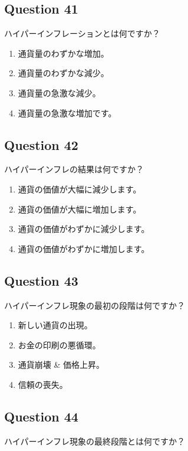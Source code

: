 \documentclass[12pt,a4paper]{article}
\begin{document}
\bigskip


\subsection*{Question 41}
ハイパーインフレーションとは何ですか？

\begin{enumerate}[label=\Alph*., leftmargin=*]
\item 通貨量のわずかな増加。
\item 通貨量のわずかな減少。
\item 通貨量の急激な減少。
\item 通貨量の急激な増加です。
\end{enumerate}

\bigskip


\subsection*{Question 42}
ハイパーインフレの結果は何ですか？

\begin{enumerate}[label=\Alph*., leftmargin=*]
\item 通貨の価値が大幅に減少します。
\item 通貨の価値が大幅に増加します。
\item 通貨の価値がわずかに減少します。
\item 通貨の価値がわずかに増加します。
\end{enumerate}

\bigskip


\subsection*{Question 43}
ハイパーインフレ現象の最初の段階は何ですか？

\begin{enumerate}[label=\Alph*., leftmargin=*]
\item 新しい通貨の出現。
\item お金の印刷の悪循環。
\item 通貨崩壊 & 価格上昇。
\item 信頼の喪失。
\end{enumerate}

\bigskip


\subsection*{Question 44}
ハイパーインフレ現象の最終段階とは何ですか？
\end{document}
